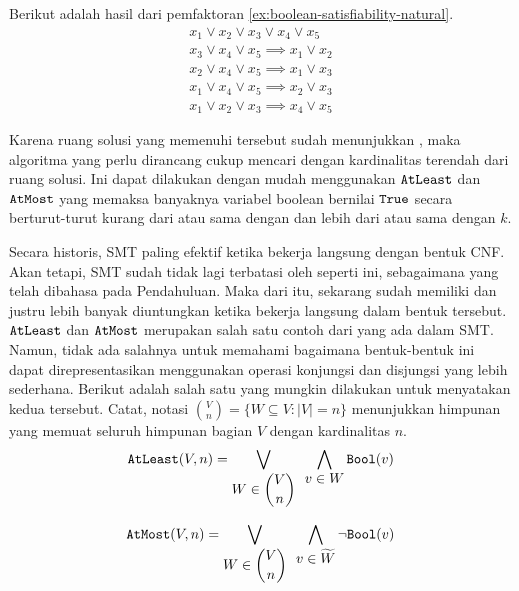 \begin{example}
	Berikut adalah hasil dari pemfaktoran \autoref{ex:boolean-satisfiability-natural}.
	\[
		\begin{array}{c}
			x_1 \vee x_2 \vee x_3 \vee x_4 \vee x_5 \\ [4pt]
			x_3 \vee x_4 \vee x_5 \implies x_1 \vee x_2 \\
			x_2 \vee x_4 \vee x_5 \implies x_1 \vee x_3 \\
			x_1 \vee x_4 \vee x_5 \implies x_2 \vee x_3 \\
			x_1 \vee x_2 \vee x_3 \implies x_4 \vee x_5
		\end{array}
	\]
	\label{ex:boolean-satisfiability}
\end{example}

Karena ruang solusi  yang memenuhi  tersebut sudah menunjukkan , maka algoritma yang perlu dirancang cukup mencari  dengan kardinalitas terendah dari ruang solusi. Ini dapat dilakukan dengan mudah menggunakan  \(\mathtt{AtLeast}\) dan \(\mathtt{AtMost}\) yang memaksa banyaknya variabel boolean bernilai \(\mathtt{True}\) secara berturut-turut kurang dari atau sama dengan dan lebih dari atau sama dengan \(k\).

Secara historis, SMT paling efektif ketika bekerja langsung dengan bentuk CNF. Akan tetapi, SMT  sudah tidak lagi terbatasi oleh  seperti ini, sebagaimana yang telah dibahasa pada Pendahuluan. Maka dari itu,  sekarang sudah memiliki  dan justru lebih banyak diuntungkan ketika bekerja langsung dalam bentuk tersebut.  \(\mathtt{AtLeast}\) dan \(\mathtt{AtMost}\) merupakan salah satu contoh dari  yang ada dalam SMT. Namun, tidak ada salahnya untuk memahami bagaimana bentuk-bentuk ini dapat direpresentasikan menggunakan operasi konjungsi dan disjungsi yang lebih sederhana. Berikut adalah salah satu  yang mungkin dilakukan untuk menyatakan kedua  tersebut. Catat, notasi \(\displaystyle \binom{V}{n} = \{W \subseteq V : |V| = n\}\) menunjukkan himpunan yang memuat seluruh himpunan bagian \(V\) dengan kardinalitas \(n\).
\[
	\mathtt{AtLeast}(V, n) = \displaystyle \bigvee \limits_{\displaystyle W \in \binom{V}{n}} \enspace \bigwedge \limits_{\displaystyle v \in W} \mathtt{Bool}(v)
\]

\[
	\mathtt{AtMost}(V, n) = \displaystyle \bigvee \limits_{\displaystyle W \in \binom{V}{n}} \enspace \bigwedge \limits_{\displaystyle v \in \widetilde{W}} \neg \mathtt{Bool}(v)
\]

